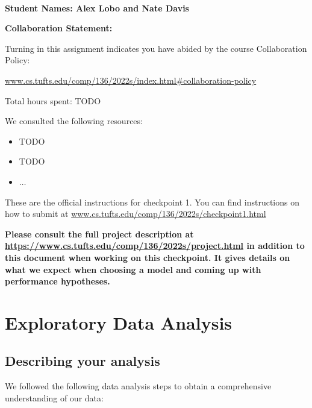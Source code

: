 \documentclass[12pt]{article}
\begin{document}
~~\\ %

{\Large{\bf Student Names: Alex Lobo and Nate Davis}}


{\Large{\bf Collaboration Statement:}}

Turning in this assignment indicates you have abided by the course Collaboration Policy:

\url{www.cs.tufts.edu/comp/136/2022s/index.html#collaboration-policy}

Total hours spent: TODO

We consulted the following resources:
\begin{itemize}
\item TODO
\item TODO
\item $\ldots$	
\end{itemize}

These are the official instructions for checkpoint 1.  You can find instructions on how to submit at \url{www.cs.tufts.edu/comp/136/2022s/checkpoint1.html}

\textbf{Please consult the full project description at \url{https://www.cs.tufts.edu/comp/136/2022s/project.html} in addition to this document when working on this checkpoint.  It gives details on what we expect when choosing a model and coming up with performance hypotheses.}

\newpage

\section{Exploratory Data Analysis}

\subsection{Describing your analysis}

We followed the following data analysis steps to obtain a comprehensive understanding of our data:
\end{document}
